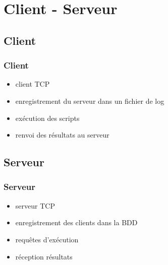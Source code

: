 \section{Client - Serveur}

	\subsection{Client}
		\begin{frame}
		    \frametitle{\textbf{Client}}
			\begin{itemize}
				 \item client TCP
				 \item enregistrement du serveur dans un fichier de log
				 \item exécution des scripts
				 \item renvoi des résultats au serveur
			\end{itemize}
		\end{frame}

	\subsection{Serveur}
		\begin{frame}
		    \frametitle{\textbf{Serveur}}
		    \begin{itemize}
		    	\item serveur TCP
		    	\item enregistrement des clients dans la BDD
		    	\item requêtes d'exécution
		    	\item réception résultats
		    \end{itemize}
		   \end{frame}		